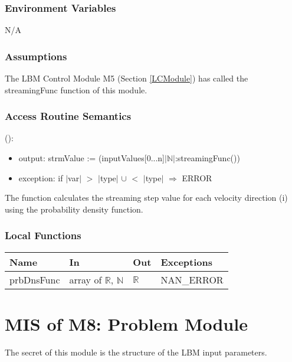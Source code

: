 \documentclass[12pt, titlepage]{article}
\begin{document}
\subsubsection{Environment Variables}
N/A

\subsubsection{Assumptions}

The LBM Control Module M5 (Section \ref{LCModule}) has called the streamingFunc function of this module.

\subsubsection{Access Routine Semantics}

\noindent {}():
\begin{itemize}
	\item output: strmValue := (inputValues[0...n]$|$$\mathbb{N}$$|$:streamingFunc())
	\item exception: if $|$var$|$ $>$ $|$type$|$ $\cup$ $<$ $|$type$|$ $\Rightarrow$ ERROR
\end{itemize}

The function calculates the streaming step value for each velocity direction (i) using the probability density function.

\subsubsection{Local Functions}

\begin{center}
	\begin{tabular}{p{2cm} p{4cm} p{4cm} p{2cm}}
		\hline
		\textbf{Name} & \textbf{In} & \textbf{Out} & \textbf{Exceptions} \\
		\hline
		prbDnsFunc & array of $\mathbb{R}$, $\mathbb{N}$ & $\mathbb{R}$ & NAN\_ERROR \\
		\hline
	\end{tabular}
\end{center}

\newpage

\section{MIS of M8: Problem Module} \label{PRModule}

The secret of this module is the structure of the LBM input parameters.
\end{document}
